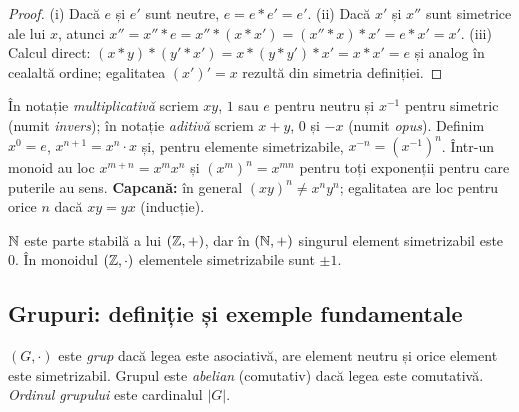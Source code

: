 \begin{proof}
(i) Dacă $e$ și $e'$ sunt neutre, $e=e*e'=e'$. (ii) Dacă $x'$ și $x''$ sunt simetrice ale lui $x$, atunci
$x''=x''*e=x''*(x*x')=(x''*x)*x'=e*x'=x'$. (iii) Calcul direct:
$(x*y)*(y'*x')=x*(y*y')*x'=x*x'=e$ și analog în cealaltă ordine; egalitatea $(x')'=x$ rezultă din simetria definiției.
\end{proof}

\begin{observatie}
În notație \emph{multiplicativă} scriem $xy$, $1$ sau $e$ pentru neutru și $x^{-1}$ pentru simetric (numit \emph{invers}); în notație \emph{aditivă} scriem $x+y$, $0$ și $-x$ (numit \emph{opus}). Definim $x^0=e$, $x^{n+1}=x^n\cdot x$ și, pentru elemente simetrizabile, $x^{-n}=(x^{-1})^n$. Într-un monoid au loc $x^{m+n}=x^m x^n$ și $(x^m)^n=x^{mn}$ pentru toți exponenții pentru care puterile au sens. \textbf{Capcană:} în general $(xy)^n\neq x^n y^n$; egalitatea are loc pentru orice $n$ dacă $xy=yx$ (inducție).
\end{observatie}

\begin{exemplu}
$\mathbb{N}$ este parte stabilă a lui $(\mathbb{Z},+)$, dar în $(\mathbb{N},+)$ singurul element simetrizabil este $0$. În monoidul $(\mathbb{Z},\cdot)$ elementele simetrizabile sunt $\pm 1$.
\end{exemplu}

\subsection{Grupuri: definiție și exemple fundamentale}

\begin{definitie}
$(G,\cdot)$ este \emph{grup} dacă legea este asociativă, are element neutru și orice element este simetrizabil. Grupul este \emph{abelian} (comutativ) dacă legea este comutativă. \emph{Ordinul grupului} este cardinalul $|G|$.
\end{definitie}

